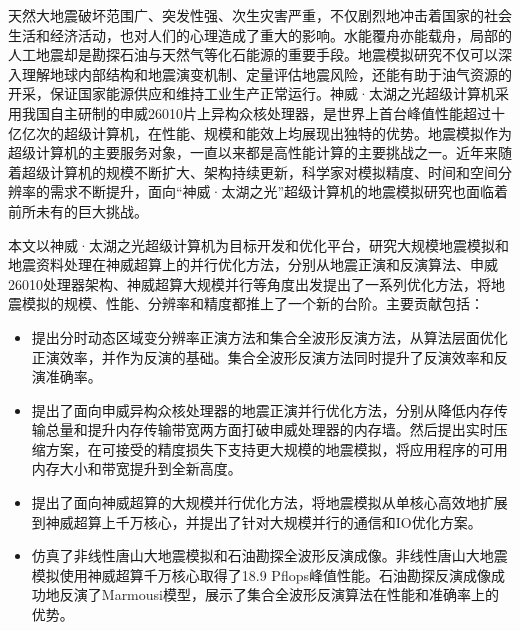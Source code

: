 \begin{cabstract}
天然大地震破坏范围广、突发性强、次生灾害严重，不仅剧烈地冲击着国家的社会生活和经济活动，也对人们的心理造成了重大的影响。水能覆舟亦能载舟，局部的人工地震却是勘探石油与天然气等化石能源的重要手段。地震模拟研究不仅可以深入理解地球内部结构和地震演变机制、定量评估地震风险，还能有助于油气资源的开采，保证国家能源供应和维持工业生产正常运行。神威·太湖之光超级计算机采用我国自主研制的申威26010片上异构众核处理器，是世界上首台峰值性能超过十亿亿次的超级计算机，在性能、规模和能效上均展现出独特的优势。地震模拟作为超级计算机的主要服务对象，一直以来都是高性能计算的主要挑战之一。近年来随着超级计算机的规模不断扩大、架构持续更新，科学家对模拟精度、时间和空间分辨率的需求不断提升，面向“神威·太湖之光”超级计算机的地震模拟研究也面临着前所未有的巨大挑战。


本文以神威·太湖之光超级计算机为目标开发和优化平台，研究大规模地震模拟和地震资料处理在神威超算上的并行优化方法，分别从地震正演和反演算法、申威26010处理器架构、神威超算大规模并行等角度出发提出了一系列优化方法，将地震模拟的规模、性能、分辨率和精度都推上了一个新的台阶。主要贡献包括：
  \begin{itemize}
    \item 提出分时动态区域变分辨率正演方法和集合全波形反演方法，从算法层面优化正演效率，并作为反演的基础。集合全波形反演方法同时提升了反演效率和反演准确率。
    
    \item 提出了面向申威异构众核处理器的地震正演并行优化方法，分别从降低内存传输总量和提升内存传输带宽两方面打破申威处理器的内存墙。然后提出实时压缩方案，在可接受的精度损失下支持更大规模的地震模拟，将应用程序的可用内存大小和带宽提升到全新高度。
    
    \item 提出了面向神威超算的大规模并行优化方法，将地震模拟从单核心高效地扩展到神威超算上千万核心，并提出了针对大规模并行的通信和IO优化方案。

    \item 仿真了非线性唐山大地震模拟和石油勘探全波形反演成像。非线性唐山大地震模拟使用神威超算千万核心取得了18.9 Pflops峰值性能。石油勘探反演成像成功地反演了Marmousi模型，展示了集合全波形反演算法在性能和准确率上的优势。
  \end{itemize}

\end{cabstract}


